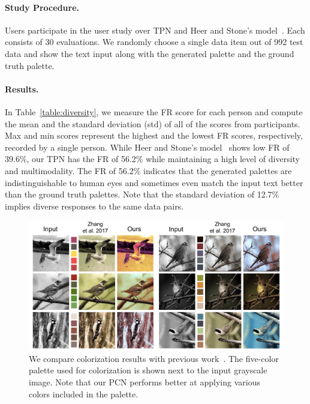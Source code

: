 \documentclass[runningheads]{llncs}
\begin{document}
\paragraph{Study Procedure.}
Users participate in the user study over TPN and Heer and Stone's model~\cite{heer2012color}. Each consists of 30 evaluations. We randomly choose a single data item out of 992 test data and show the text input along with the generated palette and the ground truth palette.

\paragraph{Results.}
In Table~\ref{table:diversity}, we measure the FR score for each person and compute the mean and the standard deviation (std) of all of the scores from participants. Max and min scores represent the highest and the lowest FR scores, respectively, recorded by a single person. While Heer and Stone's model~\cite{heer2012color} shows low FR of 39.6\%, our TPN has the FR of 56.2\% while maintaining a high level of diversity and multimodality. The FR of 56.2\% indicates that the generated palettes are indistinguishable to human eyes and sometimes even match the input text better than the ground truth palettes. Note that the standard deviation of 12.7\% implies diverse responses to the same data pairs.        

\begin{figure}[t]
\centering
\includegraphics[width=\textwidth]{./color_compare.png}
\caption{We compare colorization results with previous work~\cite{zhang2017real}. The five-color palette used for colorization is shown next to the input grayscale image. Note that our PCN performs better at applying various colors included in the palette.}\label{fig:colorization_comparison}
\end{figure}
\end{document}
